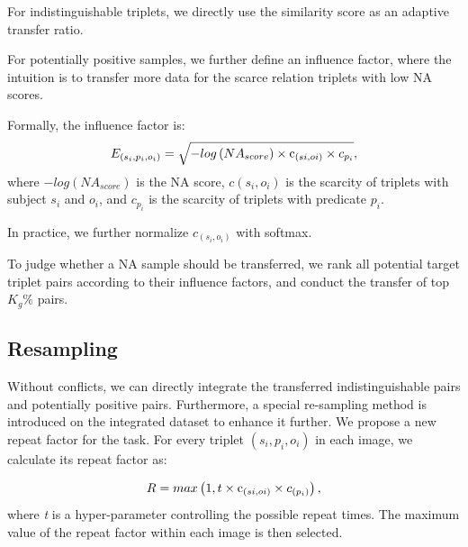 \documentclass[letterpaper]{article} %
\begin{document}
For indistinguishable triplets, we directly use the similarity score as an adaptive transfer ratio. 

For potentially positive samples, we further define an influence factor, where the intuition is to transfer more data for the scarce relation triplets with low NA scores.

Formally, the influence factor is: 
\begin{equation}
{E}_{\left(s_i,p_i,o_i\right)}=\sqrt{-log\left({NA}_{score}\right)\times{\rm c}_{\left(si,oi\right)}\times{c}_{p_i}},
\end{equation}
where $-log(NA_{score})$ is the NA score, $c(s_i, o_i)$ is the scarcity of triplets with subject $s_i$ and $o_i$, and $ c_{p_i} $ is the scarcity of triplets with predicate $ p_i $.



In practice, we further normalize $c_{(s_i, o_i)}$ with softmax.

To judge whether a NA sample should be transferred, we rank all potential target triplet pairs according to their influence factors, and conduct the transfer of top $K_g\%$ pairs.


\subsection{Resampling}
\label{Re}
Without conflicts, we can directly integrate the transferred indistinguishable pairs and potentially positive pairs. Furthermore, a special re-sampling method is introduced on the integrated dataset to enhance it further.
We propose a new repeat factor for the task. For every triplet $(s_i,p_i,o_i)$ in each image, we calculate its repeat factor as:

\begin{equation}
{R}=max\left(1,t\times{\rm c}_{\left(si,oi\right)}\times{c}_{\left(p_i\right)}\right),
\end{equation}
where \textit{t} is a hyper-parameter controlling the possible repeat times. The maximum value of the repeat factor within each image is then selected.
\end{document}
